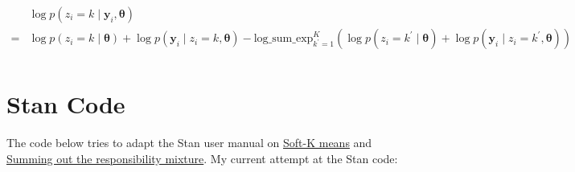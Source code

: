 \documentclass[12pt,letterpaper]{article}
\newcommand{\bth}{\bm{\theta}}
\newcommand{\by}{\mathbf{y}}
\begin{document}
\begin{align*}
&\log p(z_i = k \mid \by_{i}, \bth)\\
=& \log p(z_i = k \mid \bth) + \log p(\by_i \mid z_i = k,  \bth)   - \mathrm{log\_sum\_exp}_{k^\prime = 1}^K\left(\log p(z_i = k^\prime \mid \bth) + \log p(\by_i \mid z_i = k^\prime, \bth)\right)\\
\end{align*}

\pagebreak

\section{Stan Code}

The code below tries to adapt the Stan user manual on
\href{https://mc-stan.org/docs/2_20/stan-users-guide/soft-k-means.html}{Soft-K
means} and
\href{https://mc-stan.org/docs/2_20/stan-users-guide/summing-out-the-responsibility-parameter.html}{Summing
out the responsibility mixture}. My current attempt at the Stan code:
\end{document}
